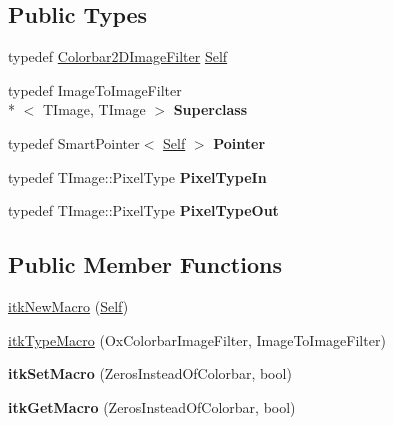 \subsection*{Public Types}
\begin{DoxyCompactItemize}
\item 
typedef \hyperlink{classitk_1_1_colorbar2_d_image_filter}{Colorbar2\-D\-Image\-Filter} \hyperlink{classitk_1_1_colorbar2_d_image_filter_a2c93d9d0cfe2be77c3f86bf7c9526c34}{Self}
\item 
\hypertarget{classitk_1_1_colorbar2_d_image_filter_a5e77f2c1678f5a62d635afa7077c227f}{typedef Image\-To\-Image\-Filter\\*
$<$ T\-Image, T\-Image $>$ {\bfseries Superclass}}\label{classitk_1_1_colorbar2_d_image_filter_a5e77f2c1678f5a62d635afa7077c227f}

\item 
\hypertarget{classitk_1_1_colorbar2_d_image_filter_a31bbb4eebad609e9dfca8f87a69a70ad}{typedef Smart\-Pointer$<$ \hyperlink{classitk_1_1_colorbar2_d_image_filter_a2c93d9d0cfe2be77c3f86bf7c9526c34}{Self} $>$ {\bfseries Pointer}}\label{classitk_1_1_colorbar2_d_image_filter_a31bbb4eebad609e9dfca8f87a69a70ad}

\item 
\hypertarget{classitk_1_1_colorbar2_d_image_filter_a9cf8e325a86cac28dc661647905381f9}{typedef T\-Image\-::\-Pixel\-Type {\bfseries Pixel\-Type\-In}}\label{classitk_1_1_colorbar2_d_image_filter_a9cf8e325a86cac28dc661647905381f9}

\item 
\hypertarget{classitk_1_1_colorbar2_d_image_filter_acb0402b76750a2b5f895e5f1ca0e56c0}{typedef T\-Image\-::\-Pixel\-Type {\bfseries Pixel\-Type\-Out}}\label{classitk_1_1_colorbar2_d_image_filter_acb0402b76750a2b5f895e5f1ca0e56c0}

\end{DoxyCompactItemize}
\subsection*{Public Member Functions}
\begin{DoxyCompactItemize}
\item 
\hyperlink{classitk_1_1_colorbar2_d_image_filter_abd868d4b97128f6fd9373bc4929792e6}{itk\-New\-Macro} (\hyperlink{classitk_1_1_colorbar2_d_image_filter_a2c93d9d0cfe2be77c3f86bf7c9526c34}{Self})
\item 
\hyperlink{classitk_1_1_colorbar2_d_image_filter_ace645ca59853c18b7c077c2c852b3712}{itk\-Type\-Macro} (Ox\-Colorbar\-Image\-Filter, Image\-To\-Image\-Filter)
\item 
\hypertarget{classitk_1_1_colorbar2_d_image_filter_a6d917b33043bdb319ed4ba90a8ea25a9}{{\bfseries itk\-Set\-Macro} (Zeros\-Instead\-Of\-Colorbar, bool)}\label{classitk_1_1_colorbar2_d_image_filter_a6d917b33043bdb319ed4ba90a8ea25a9}

\item 
\hypertarget{classitk_1_1_colorbar2_d_image_filter_a28c52d8f603e3f1a554a59c3ec71f9ea}{{\bfseries itk\-Get\-Macro} (Zeros\-Instead\-Of\-Colorbar, bool)}\label{classitk_1_1_colorbar2_d_image_filter_a28c52d8f603e3f1a554a59c3ec71f9ea}

\end{DoxyCompactItemize}
